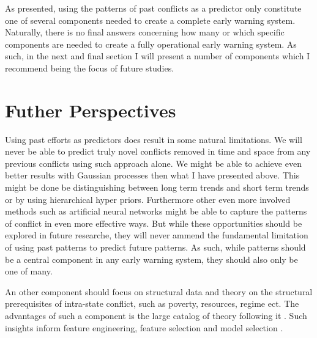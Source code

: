 \documentclass[a4paper]{article}
\begin{document}
As presented, using the patterns of past conflicts as a predictor only constitute one of several components needed to create a complete early warning system. Naturally, there is no final answers concerning how many or which specific components are needed to create a fully operational early warning system. As such, in the next and final section I will present a number of components which I recommend being the focus of future studies.\par



\section{Futher Perspectives}

Using past efforts as predictors does result in some natural limitations. We will never be able to predict truly novel conflicts removed in time and space from any previous conflicts using such approach alone. We might be able to achieve even better results with Gaussian processes then what I have presented above. This might be done be distinguishing between long term trends and short term trends or by using hierarchical hyper priors. Furthermore other even more involved methods such as artificial neural networks might be able to capture the patterns of conflict in even more effective ways. But while these opportunities should be explored in future researche, they will never ammend the fundamental limitation of using past patterns to predict future patterns. As such, while patterns should be a central component in any early warning system, they should also only be one of many.\par


An other component should focus on structural data and theory on the structural prerequisites of intra-state conflict, such as poverty, resources, regime ect. The advantages of such a component is the large catalog of theory following it \citep{Collier_Hoeffler_1998, Fearon_Laitin_2003, Collier_Hoeffler_2004, Hegre_Sambanis_2006, Kalyvas_2007, Goldstone_2010, Cederman_Gleditsch_Buhaug_2013, perry_2013}. Such insights inform feature engineering, feature selection and model selection \cite[30]{Cederman_Gleditsch_Buhaug_2013}.\par
\end{document}
